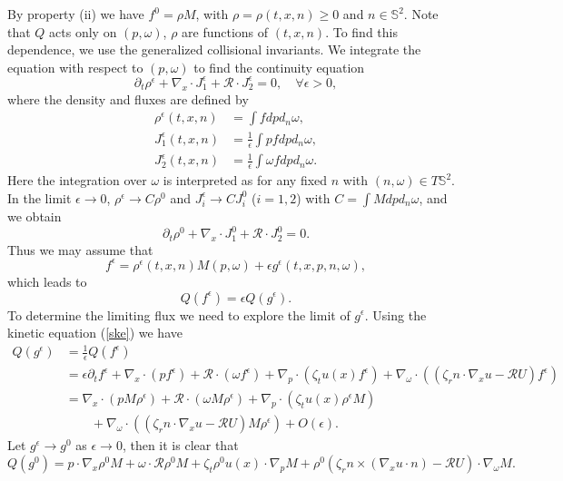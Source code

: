 \documentclass[reqno]{amsart}
\numberwithin{equation}{section}
\theoremstyle{definition}
\theoremstyle{remark}
\begin{document}
By property (ii) we have $f^0=\rho M$, with $\rho=\rho(t, x, n) \geq
0$ and $n\in \mathbb{S}^2$. Note that $Q$ acts only on $(p,
\omega)$, $\rho$ are functions of $(t, x, n)$.   To find this
dependence, we use the generalized collisional invariants. We
integrate the equation with respect to $(p, \omega)$ to find the
continuity equation
$$
\partial_t \rho^\epsilon +\nabla_x \cdot J_1^\epsilon +\mathcal{R} \cdot J_2^\epsilon=0, \quad \forall \epsilon>0,
$$
where the density and fluxes are defined by
\begin{align*}
\rho^\epsilon(t, x, n)& =\int f dpd_n\omega,\\
J_1^\epsilon(t, x, n)& =\frac{1}{\epsilon}\int p f dpd_n\omega,\\
J_2^\epsilon(t, x, n)& =\frac{1}{\epsilon}\int \omega f dpd_n\omega.
\end{align*}
Here the integration over $\omega$ is interpreted as for any fixed
$n$ with $(n, \omega)\in T\mathbb{S}^2$. In the limit $\epsilon \to
0$, $\rho^\epsilon \to C \rho^0$ and $J_i^\epsilon \to C J_i^0$
($i=1,2$) with $C=\int Mdpd_n\omega$, and we obtain
\begin{equation}\label{limit}
  \partial_t\rho^0 +\nabla_x \cdot J_1^0 +\mathcal{R} \cdot J_2^0=0.
\end{equation}
Thus we may assume that
$$
f^\epsilon=\rho^\epsilon(t, x, n)M(p, \omega) +\epsilon g^\epsilon(t, x, p, n, \omega),
$$
which leads to
$$
Q(f^\epsilon)=\epsilon Q(g^\epsilon).
$$
To determine the limiting flux we need to explore the limit of $g^\epsilon$. Using the kinetic equation (\ref{ske}) we have
\begin{align*}
Q(g^\epsilon) &=\frac{1}{\epsilon} Q(f^\epsilon)\\
& =\epsilon \partial_t f^\epsilon +
\nabla_x\cdot(pf^\epsilon)+\mathcal{R} \cdot(\omega f^\epsilon)+
\nabla_p\cdot(\zeta_t u(x)f^\epsilon)+ \nabla_\omega \cdot((\zeta_r
n\cdot \nabla_x
u-\mathcal{R }U)f^\epsilon)\\
& =\nabla_x\cdot(pM\rho^\epsilon )+ \mathcal{R }\cdot(\omega
M\rho^\epsilon)+
\nabla_p\cdot(\zeta_t u(x) \rho^\epsilon M)\\
& \qquad + \nabla_\omega \cdot((\zeta_r n\cdot \nabla_x u-\mathcal{R} U)M\rho^\epsilon)
+O(\epsilon).
\end{align*}
Let $g^\epsilon \to g^0$ as $\epsilon \to 0$, then it is clear that
$$
Q(g^0)=p\cdot \nabla_x \rho^0 M+ \omega \cdot \mathcal{R} \rho^0 M +\zeta_t
\rho^0 u(x) \cdot \nabla_p M + \rho^0 (\zeta_r n \times (\nabla_xu \cdot n) -\mathcal{R}U)\cdot
\nabla_\omega M.
$$
\end{document}
